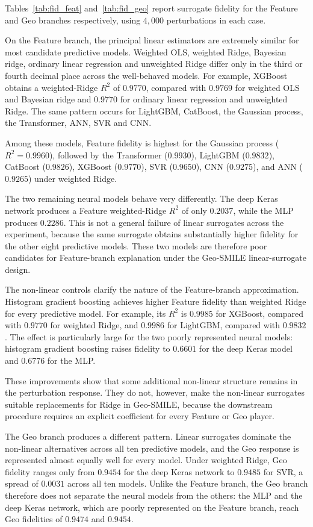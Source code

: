 Tables~\ref{tab:fid_feat} and~\ref{tab:fid_geo} report surrogate fidelity for the Feature and Geo branches respectively, using $4{,}000$ perturbations in each case.

On the Feature branch, the principal linear estimators are extremely similar for most candidate predictive models. Weighted OLS, weighted Ridge, Bayesian ridge, ordinary linear regression and unweighted Ridge differ only in the third or fourth decimal place across the well-behaved models. For example, XGBoost obtains a weighted-Ridge $R^2$ of $0.9770$, compared with $0.9769$ for weighted OLS and Bayesian ridge and $0.9770$ for ordinary linear regression and unweighted Ridge. The same pattern occurs for LightGBM, CatBoost, the Gaussian process, the Transformer, ANN, SVR and CNN.

Among these models, Feature fidelity is highest for the Gaussian process ($R^2=0.9960$), followed by the Transformer ($0.9930$), LightGBM ($0.9832$), CatBoost ($0.9826$), XGBoost ($0.9770$), SVR ($0.9650$), CNN ($0.9275$), and ANN ($0.9265$) under weighted Ridge.

The two remaining neural models behave very differently. The deep Keras network produces a Feature weighted-Ridge $R^2$ of only $0.2037$, while the MLP produces $0.2286$. This is not a general failure of linear surrogates across the experiment, because the same surrogate obtains substantially higher fidelity for the other eight predictive models. These two models are therefore poor candidates for Feature-branch explanation under the Geo-SMILE linear-surrogate design.

The non-linear controls clarify the nature of the Feature-branch approximation. Histogram gradient boosting achieves higher Feature fidelity than weighted Ridge for every predictive model. For example, its $R^2$ is $0.9985$ for XGBoost, compared with $0.9770$ for weighted Ridge, and $0.9986$ for LightGBM, compared with $0.9832$. The effect is particularly large for the two poorly represented neural models: histogram gradient boosting raises fidelity to $0.6601$ for the deep Keras model and $0.6776$ for the MLP.

These improvements show that some additional non-linear structure remains in the perturbation response. They do not, however, make the non-linear surrogates suitable replacements for Ridge in Geo-SMILE, because the downstream procedure requires an explicit coefficient for every Feature or Geo player.

The Geo branch produces a different pattern. Linear surrogates dominate the non-linear alternatives across all ten predictive models, and the Geo response is represented almost equally well for every model. Under weighted Ridge, Geo fidelity ranges only from $0.9454$ for the deep Keras network to $0.9485$ for SVR, a spread of $0.0031$ across all ten models. Unlike the Feature branch, the Geo branch therefore does not separate the neural models from the others: the MLP and the deep Keras network, which are poorly represented on the Feature branch, reach Geo fidelities of $0.9474$ and $0.9454$.

